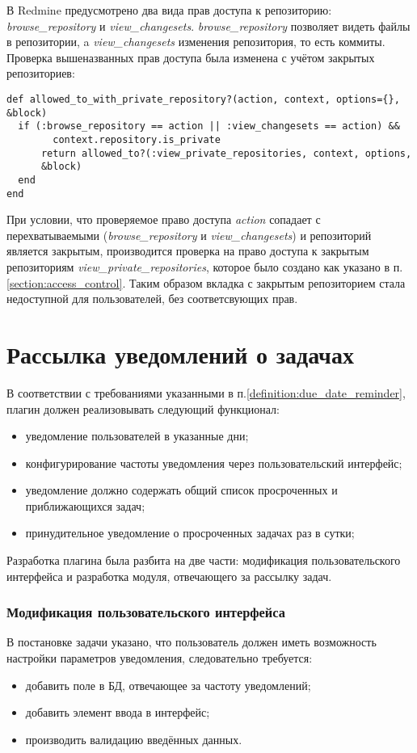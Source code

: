 В Redmine предусмотрено два вида прав доступа к репозиторию:
\textit{browse\_repository} и \textit{view\_changesets}.
\textit{browse\_repository} позволяет видеть файлы в репозитории, a
\textit{view\_changesets} изменения репозитория, то есть коммиты.
Проверка вышеназванных прав доступа была изменена с учётом закрытых
репозиториев:
\small{\begin{lstlisting}
def allowed_to_with_private_repository?(action, context, options={}, &block)
  if (:browse_repository == action || :view_changesets == action) &&
        context.repository.is_private 
      return allowed_to?(:view_private_repositories, context, options,
      &block)       
  end
end
\end{lstlisting}}
При условии, что проверяемое право доступа \textit{action} сопадает с
перехватываемыми (\textit{browse\_repository } и \textit{view\_changesets}) и
репозиторий является закрытым, производится проверка на право доступа к
закрытым репозиториям \textit{view\_private\_repositories}, которое было
создано как указано в п.\ref{section:access_control}. Таким образом
вкладка с закрытым репозиторием стала недоступной для пользователей, без
соответсвующих прав.


\section{Рассылка уведомлений о задачах}
В соответствии с требованиями указанными в
п.\ref{definition:due_date_reminder}, плагин должен реализовывать следующий
функционал:
\begin{itemize}
  \item уведомление пользователей в указанные дни;
  \item конфигурирование частоты уведомления через пользовательский интерфейс;
  \item уведомление должно содержать общий список просроченных и приближающихся
  задач;
  \item принудительное уведомление о просроченных задачах раз в сутки;
\end{itemize}
Разработка плагина была разбита на две части: модификация пользовательского
интерфейса и разработка модуля, отвечающего за рассылку задач.

\subsubsection{Модификация пользовательского интерфейса}
В постановке задачи указано, что пользователь должен иметь возможность
настройки параметров уведомления, следовательно требуется:
\begin{itemize}
  \item добавить поле в БД, отвечающее за частоту уведомлений;
  \item добавить элемент ввода в интерфейс;
  \item производить валидацию введённых данных.
\end{itemize}


